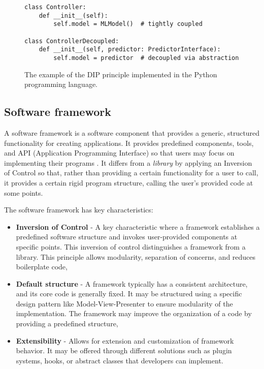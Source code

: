 \documentclass[
    bindingoffset=5mm,  %
    footnoteindent=3mm, %
    hyphenation=true    %
]{src/wut-thesis}
\begin{document}
\begin{figure}%
\begin{verbatim}
class Controller:
    def __init__(self):
        self.model = MLModel()  # tightly coupled

class ControllerDecoupled:
    def __init__(self, predictor: PredictorInterface):
        self.model = predictor  # decoupled via abstraction
\end{verbatim}
\caption{The example of the DIP principle implemented in the Python programming language.}
\label{fig:DepInversionPrinciple}
\end{figure}

\subsection{Software framework} \label{ch2:SoftwareFramework}

A software framework is a software component that provides a generic, structured functionality
for creating applications. It provides predefined components, tools, and API (Application Programming Interface)
so that users may focus on implementing their programs \cite{buschmann1996pattern}.
It differs from a \emph{library} by applying an Inversion of Control so that, rather than
providing a certain functionality for a user to call, it provides a certain rigid program
structure, calling the user’s provided code at some points.

The software framework has key characteristics:
\begin{itemize}
    \item \textbf{Inversion of Control} - A key characteristic where a framework establishes a predefined
        software structure and invokes user-provided components at specific points. This inversion of
        control distinguishes a framework from a library. This principle allows modularity,
        separation of concerns, and reduces boilerplate code,
    \item \textbf{Default structure} - A framework typically has a consistent architecture, and its
        core code is generally fixed. It may be structured using a specific design pattern like
        Model-View-Presenter to ensure modularity of the implementation. The framework may improve
        the organization of a code by providing a predefined structure,
    \item \textbf{Extensibility} - Allows for extension and customization of framework behavior.
        It may be offered through different solutions such as plugin systems, hooks, or abstract
        classes that developers can implement.
\end{itemize}
\end{document}
